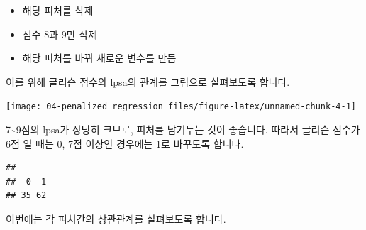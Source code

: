 \documentclass[12pt,]{book}
\newenvironment{Shaded}{\begin{snugshade}}{\end{snugshade}}
\newcommand{\DataTypeTok}[1]{\textcolor[rgb]{0.13,0.29,0.53}{#1}}
\newcommand{\DecValTok}[1]{\textcolor[rgb]{0.00,0.00,0.81}{#1}}
\newcommand{\KeywordTok}[1]{\textcolor[rgb]{0.13,0.29,0.53}{\textbf{#1}}}
\newcommand{\NormalTok}[1]{#1}
\newcommand{\OperatorTok}[1]{\textcolor[rgb]{0.81,0.36,0.00}{\textbf{#1}}}
\newcommand{\StringTok}[1]{\textcolor[rgb]{0.31,0.60,0.02}{#1}}
\providecommand{\tightlist}{%
  \setlength{\itemsep}{0pt}\setlength{\parskip}{0pt}}
\begin{document}
\begin{itemize}
\tightlist
\item
  해당 피처를 삭제
\item
  점수 8과 9만 삭제
\item
  해당 피처를 바꿔 새로운 변수를 만듬
\end{itemize}

이를 위해 글리슨 점수와 lpsa의 관계를 그림으로 살펴보도록 합니다.

\begin{Shaded}
\end{Shaded}

\begin{center}\texttt{[image: 04-penalized\_regression\_files/figure-latex/unnamed-chunk-4-1]} \end{center}

7\textasciitilde{}9점의 lpsa가 상당히 크므로, 피처를 남겨두는 것이 좋습니다. 따라서 글리슨 점수가 6점 일 때는 0, 7점 이상인 경우에는 1로 바꾸도록 합니다.

\begin{Shaded}
\end{Shaded}

\begin{verbatim}
## 
##  0  1 
## 35 62
\end{verbatim}

이번에는 각 피처간의 상관관계를 살펴보도록 합니다.

\begin{Shaded}
\end{Shaded}
\end{document}
